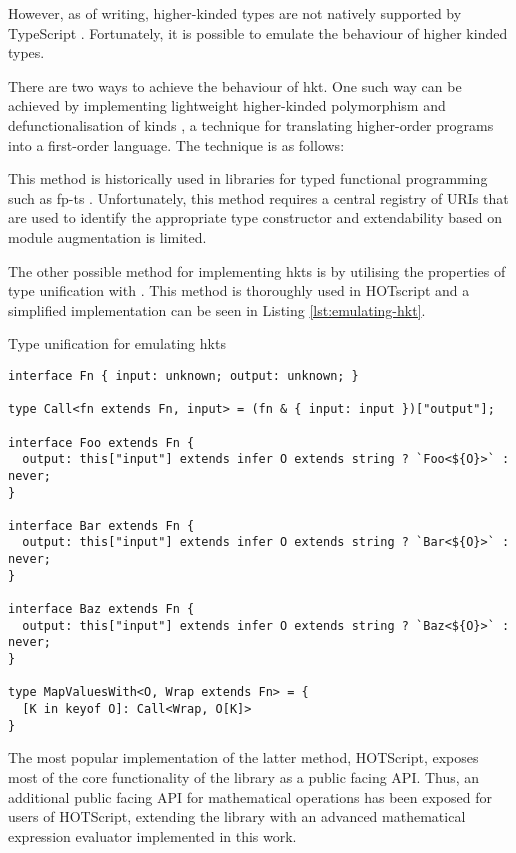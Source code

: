 However, as of writing, higher-kinded types are not natively supported by TypeScript \cite{DocumentationTypeScriptFunctional}. Fortunately, it is possible to emulate the behaviour of higher kinded types.

There are two ways to achieve the behaviour of \acrshort{hkt}. One such way can be achieved by implementing lightweight higher-kinded polymorphism \cite{yallopLightweightHigherKindedPolymorphism2014} and defunctionalisation of kinds \cite{reynoldsDefinitionalInterpretersHigherorder1972}, a technique for translating higher-order programs into a first-order language. The technique is as follows:


This method is historically used in libraries for typed functional programming such as fp-ts \cite{GcantiFptsFunctional}. Unfortunately, this method requires a central registry of URIs that are used to identify the appropriate type constructor and extendability based on module augmentation is limited.

The other possible method for implementing \acrshort{hkt}s is by utilising the properties of type unification with . This method is thoroughly used in HOTscript \cite{vergnaudHigherOrderTypeScriptHOTScript2023} and a simplified implementation can be seen in Listing \ref{lst:emulating-hkt}.

\begin{listing}[ht]
  \caption{Type unification for emulating \acrshort{hkt}s}\label{lst:emulating-hkt}
  \begin{verbatim}
interface Fn { input: unknown; output: unknown; }

type Call<fn extends Fn, input> = (fn & { input: input })["output"];

interface Foo extends Fn {
  output: this["input"] extends infer O extends string ? `Foo<${O}>` : never;
}

interface Bar extends Fn {
  output: this["input"] extends infer O extends string ? `Bar<${O}>` : never;
}

interface Baz extends Fn {
  output: this["input"] extends infer O extends string ? `Baz<${O}>` : never;
}

type MapValuesWith<O, Wrap extends Fn> = {
  [K in keyof O]: Call<Wrap, O[K]>
}
\end{verbatim}
\end{listing}

The most popular implementation of the latter method, HOTScript, exposes most of the core functionality of the library as a public facing API. Thus, an additional public facing API for mathematical operations has been exposed for users of HOTScript, extending the library with an advanced mathematical expression evaluator implemented in this work.
